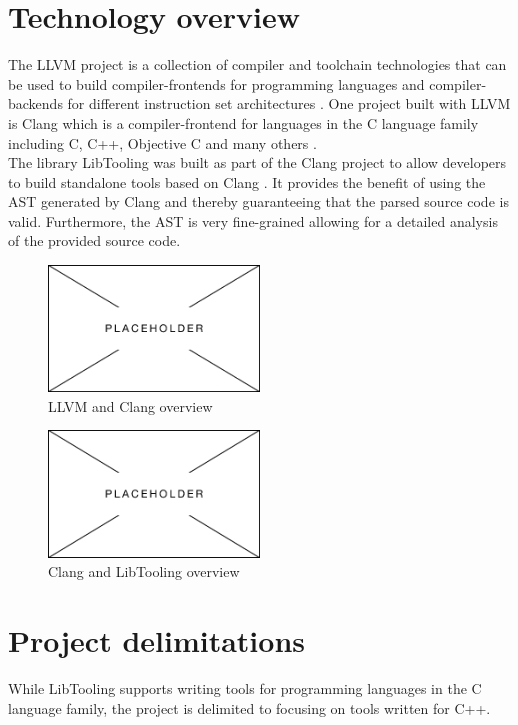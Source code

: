 \section{Technology overview}
The LLVM project is a collection of compiler and toolchain technologies that can be used to build compiler-frontends for programming languages and compiler-backends for different instruction set architectures \cite{llvmLLVMCompilerInfrastructure}.
One project built with LLVM is Clang which is a compiler-frontend for languages in the C language family including C, C++, Objective C and many others \cite{llvmClangLanguageFamily}.\\
The library LibTooling was built as part of the Clang project to allow developers to build standalone tools based on Clang \cite{llvmLibToolingClang17}. It provides the benefit of using the AST generated by Clang and thereby guaranteeing that the parsed source code is valid. Furthermore, the AST is very fine-grained allowing for a detailed analysis of the provided source code.


\begin{figure}[H]
    \centering
    \includegraphics[width=0.5\textwidth]{figs/040des/placeholder.png}
    \caption{LLVM and Clang overview}
    \label{fig:040des:llvmToolchainOverview}
\end{figure}

\begin{figure}[H]
    \centering
    \includegraphics[width=0.5\textwidth]{figs/040des/placeholder.png}
    \caption{Clang and LibTooling overview}
    \label{fig:040des:clangToolingOverview}
\end{figure}


\section{Project delimitations}
While LibTooling supports writing tools for programming languages in the C language family, the project is delimited to focusing on tools written for C++.

